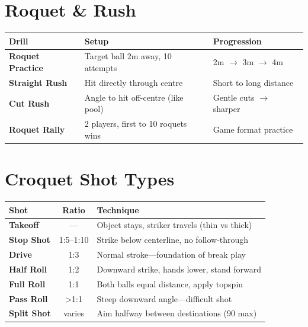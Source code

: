 \documentclass[11pt,a4paper]{article}
\begin{document}
\section{Roquet \& Rush}

\begin{tabular}{@{}p{3.5cm}p{5.5cm}p{5.5cm}@{}}
\toprule
\textbf{Drill} & \textbf{Setup} & \textbf{Progression} \\
\midrule
\textbf{Roquet Practice} & Target ball 2m away, 10 attempts & 2m $\rightarrow$ 3m $\rightarrow$ 4m \\
\textbf{Straight Rush} & Hit directly through centre & Short to long distance \\
\textbf{Cut Rush} & Angle to hit off-centre (like pool) & Gentle cuts $\rightarrow$ sharper \\
\textbf{Roquet Rally} & 2 players, first to 10 roquets wins & Game format practice \\
\bottomrule
\end{tabular}

\vspace{0.5em}

\section{Croquet Shot Types}

\begin{tabular}{@{}p{2.5cm}cp{9cm}@{}}
\toprule
\textbf{Shot} & \textbf{Ratio} & \textbf{Technique} \\
\midrule
\textbf{Takeoff} & --- & Object stays, striker travels (thin vs thick) \\
\textbf{Stop Shot} & 1:5--1:10 & Strike below centerline, no follow-through \\
\textbf{Drive} & 1:3 & Normal stroke---foundation of break play \\
\textbf{Half Roll} & 1:2 & Downward strike, hands lower, stand forward \\
\textbf{Full Roll} & 1:1 & Both balls equal distance, apply topspin \\
\textbf{Pass Roll} & >1:1 & Steep downward angle---difficult shot \\
\textbf{Split Shot} & varies & Aim halfway between destinations (90\textdegree{} max) \\
\bottomrule
\end{tabular}
\end{document}
